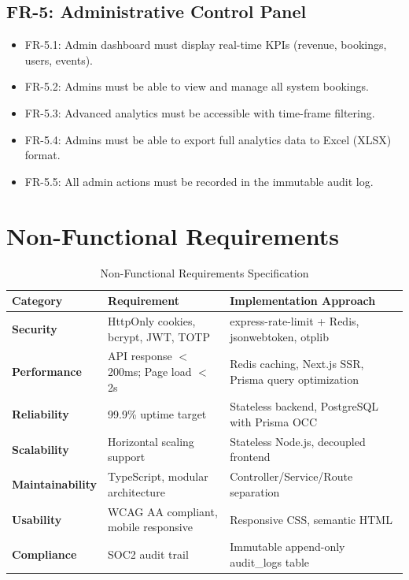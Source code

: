 \documentclass[12pt,a4paper]{report}
\begin{document}
\subsection{FR-5: Administrative Control Panel}
\begin{itemize}[leftmargin=2em]
    \item FR-5.1: Admin dashboard must display real-time KPIs (revenue, bookings, users, events).
    \item FR-5.2: Admins must be able to view and manage all system bookings.
    \item FR-5.3: Advanced analytics must be accessible with time-frame filtering.
    \item FR-5.4: Admins must be able to export full analytics data to Excel (XLSX) format.
    \item FR-5.5: All admin actions must be recorded in the immutable audit log.
\end{itemize}

\section{Non-Functional Requirements}

\begin{table}[H]
    \centering
    \caption{Non-Functional Requirements Specification}
    \vspace{0.2cm}
    \begin{tabular}{|p{3.5cm}|p{4cm}|p{5cm}|}
        \hline
        \textbf{Category} & \textbf{Requirement} & \textbf{Implementation Approach} \\
        \hline
        \textbf{Security} & HttpOnly cookies, bcrypt, JWT, TOTP & express-rate-limit + Redis, jsonwebtoken, otplib \\
        \hline
        \textbf{Performance} & API response $<$200ms; Page load $<$2s & Redis caching, Next.js SSR, Prisma query optimization \\
        \hline
        \textbf{Reliability} & 99.9\% uptime target & Stateless backend, PostgreSQL with Prisma OCC \\
        \hline
        \textbf{Scalability} & Horizontal scaling support & Stateless Node.js, decoupled frontend \\
        \hline
        \textbf{Maintainability} & TypeScript, modular architecture & Controller/Service/Route separation \\
        \hline
        \textbf{Usability} & WCAG AA compliant, mobile responsive & Responsive CSS, semantic HTML \\
        \hline
        \textbf{Compliance} & SOC2 audit trail & Immutable append-only audit\_logs table \\
        \hline
    \end{tabular}
\end{table}
\end{document}
